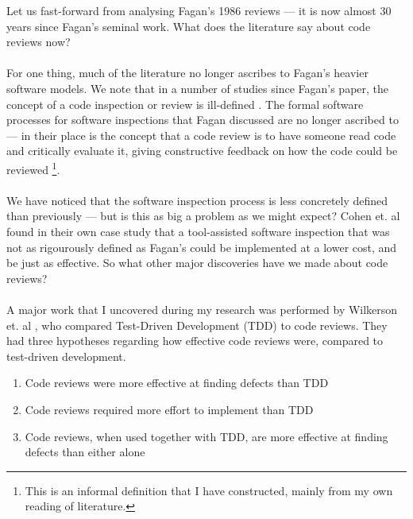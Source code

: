 Let us fast-forward from analysing Fagan's 1986 reviews --- it is now almost 30 years since Fagan's
seminal work.
What does the literature say about code reviews now?\\
\\
For one thing, much of the literature no longer ascribes to Fagan's heavier software models.
We note that in a number of studies since Fagan's paper, the concept of a code inspection or review
is ill-defined \cite{siy2001does,cohen2006best,wilkerson2012comparing,grbac2012quantifying}.
The formal software processes for software inspections that Fagan discussed are no longer ascribed
to --- in their place is the concept that a code review is to have someone read code and critically
evaluate it, giving constructive feedback on how the code could be reviewed \footnote{This is an
informal definition that I have constructed, mainly from my own reading of literature.}.\\
\\
We have noticed that the software inspection process is less concretely defined than previously ---
but is this as big a problem as we might expect?
Cohen et. al \cite{cohen2006best} found in their own case study that a tool-assisted software
inspection that was not as rigourously defined as Fagan's could be implemented at a lower cost, and
be just as effective.
So what other major discoveries have we made about code reviews?\\
\\
A major work that I uncovered during my research was performed by Wilkerson et. al
\cite{wilkerson2012comparing}, who compared Test-Driven Development (TDD) to code reviews.
They had three hypotheses regarding how effective code reviews were, compared to test-driven
development.
\begin{enumerate}
	\item  Code reviews were more effective at finding defects than TDD
	\item Code reviews required more effort to implement than TDD
	\item Code reviews, when used together with TDD, are more effective at finding defects than either alone
\end{enumerate}

